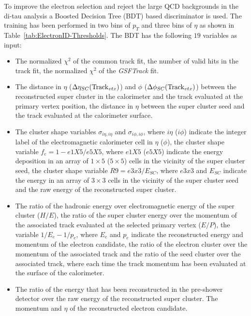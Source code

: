 To improve the electron selection and reject the large QCD backgrounds in the di-tau analysis a 
Boosted Decision Tree (BDT) based %
discriminator is used. The training has been performed in two
bins of $p_{T}$ and three bins of $\eta$ as shown in Table~\ref{tab:ElectronID-Thresholds}\@.
The BDT has the following $19$ variables as input:

\begin{itemize}
\item
The normalized $\chi^{2}$ of the common track fit, the number of valid hits in the track fit, the normalized
$\chi^{2}$ of the {\it GSFTrack} fit.
\item
The distance in $\eta$ ($\Delta\eta_{SC}({\rm Track}_{vtx})$) and $\phi$ ($\Delta\phi_{SC}({\rm Track}_{vtx})$)
between the reconstructed super cluster in the calorimeter and the track evaluated at the primary vertex
position, the distance in $\eta$ between the super cluster seed and the track evaluated at the calorimeter
surface.
\item
The cluster shape variables $\sigma_{i\eta,i\eta}$ and $\sigma_{i\phi, i\phi}$, where $i\eta$ ($i\phi$)
indicate the integer label of the electromagnetic calorimeter cell in $\eta$ ($\phi$), the cluster shape
variable $f_{e}=1-e1X5/e5X5$, where $e1X5$ ($e5X5$) indicate the energy deposition in an array of $1 \times 5$
($5 \times 5$) cells in the vicinity of the super cluster seed, the cluster shape variable $R9 = e3x3/E_{SC}$,
where $e3x3$ and $E_{SC}$ indicate the energy in an array of $3 \times 3$ cells in the vicinity of the
super cluster seed and the raw energy of the reconstructed super cluster.
\item
The ratio of the hadronic energy over electromagnetic energy of the super cluster ($H/E$), the ratio of
the super cluster energy over the momentum of the associated track evaluated at the selected primary vertex
($E/P$), the variable $1/E_{e}-1/p_{e}$, where $E_{e}$ and $p_{e}$ indicate the reconstructed energy and
momentum of the electron candidate, the ratio of the electron cluster over the momentum of the associated
track and the ratio of the seed cluster over the associated track, where each time the track momentum
has been evaluated at the surface of the calorimeter.
\item
The ratio of the energy that has been reconstructed in the pre-shower detector over the raw energy of
the reconstructed super cluster. The momentum and $\eta$ of the reconstructed electron candidate.
\end{itemize}

